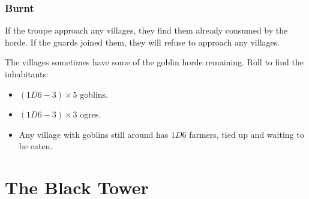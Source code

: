 \begin{multicols}{2}
\subsubsection{Burnt }

If the troupe approach any \glspl{village}, they find them already consumed by the horde.
If the \glspl{guard} joined them, they will refuse to approach any \glspl{village}.

The \glspl{village} sometimes have some of the goblin horde remaining.
Roll to find the inhabitants:

\begin{itemize}
  \item
  $(1D6 - 3)\times 5$ goblins.
  \item
  $(1D6 - 3)\times 3$ \glspl{ogre}.
  \item
  Any \gls{village} with goblins still around has $1D6$ farmers, tied up and waiting to be eaten.
\end{itemize}

\end{multicols}

\section{The Black Tower}

